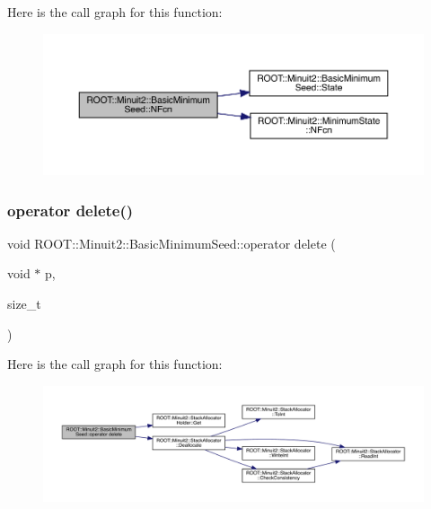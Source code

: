 Here is the call graph for this function\+:
\nopagebreak
\begin{figure}[H]
\begin{center}
\leavevmode
\includegraphics[width=350pt]{de/d50/classROOT_1_1Minuit2_1_1BasicMinimumSeed_a1d34718bf163936432ef05dea799c469_cgraph}
\end{center}
\end{figure}
\mbox{\label{classROOT_1_1Minuit2_1_1BasicMinimumSeed_ae2af98f9f03cfe5e5202153b914ff120}} 
\subsubsection{\texorpdfstring{operator delete()}{operator delete()}\hspace{0.1cm}{\footnotesize\ttfamily [1/3]}}
{\footnotesize\ttfamily void R\+O\+O\+T\+::\+Minuit2\+::\+Basic\+Minimum\+Seed\+::operator delete (\begin{DoxyParamCaption}\item[{void $\ast$}]{p,  }\item[{size\+\_\+t}]{ }\end{DoxyParamCaption})\hspace{0.3cm}{\ttfamily [inline]}}

Here is the call graph for this function\+:
\nopagebreak
\begin{figure}[H]
\begin{center}
\leavevmode
\includegraphics[width=350pt]{de/d50/classROOT_1_1Minuit2_1_1BasicMinimumSeed_ae2af98f9f03cfe5e5202153b914ff120_cgraph}
\end{center}
\end{figure}
\mbox{\label{classROOT_1_1Minuit2_1_1BasicMinimumSeed_ae2af98f9f03cfe5e5202153b914ff120}} 
